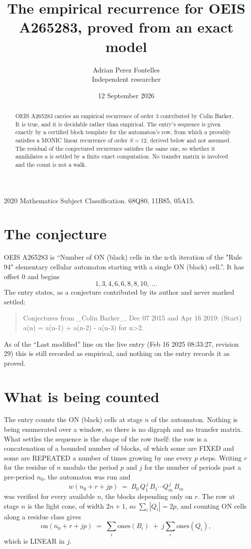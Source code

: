\documentclass[11pt,a4paper]{article}
\title{The empirical recurrence for OEIS A265283, proved from an exact model}
\author{Adrian Perez Fontelles\\ \small Independent researcher}
\date{12 September 2026}
\theoremstyle{plain}
\theoremstyle{definition}
\begin{document}
\maketitle

\begin{abstract}
OEIS A265283 carries an empirical recurrence of order $3$ contributed by Colin Barker. It is true, and it is
decidable rather than empirical. The entry's sequence is given exactly by a certified block template for the automaton's row, from
which $a$ provably satisfies a MONIC linear recurrence of order $S=12$, derived below and not
assumed. The residual of the conjectured recurrence satisfies the same one, so whether it
annihilates $a$ is settled by a finite exact computation. No transfer matrix is involved and
the count is not a walk.
\end{abstract}

\noindent\small 2020 Mathematics Subject Classification. 68Q80, 11B85, 05A15.\normalsize

\section{The conjecture}

OEIS A265283 is ``Number of ON (black) cells in the n-th iteration of the "Rule 94" elementary cellular automaton starting with a single ON (black) cell.''. It has offset $0$ and begins
\[
1, 3, 4, 6, 6, 8, 8, 10,\ \dots
\]
The entry states, as a conjecture contributed by its author and never marked settled:
\begin{quote}
Conjectures from \_Colin Barker\_, Dec 07 2015 and Apr 16 2019: (Start) a(n) = a(n-1) + a(n-2) - a(n-3) for n>2.
\end{quote}
As of the ``Last modified'' line on the live entry (Feb 16 2025 08:33:27, revision 29)
this is still recorded as empirical, and nothing on the entry records it as proved.

\section{What is being counted}

The entry counts the ON (black) cells at stage $n$ of the automaton. Nothing is being enumerated over a window, so there is
no digraph and no transfer matrix. What settles the sequence is the shape of the row itself:
the row is a concatenation of a bounded number of blocks, of which some are
FIXED and some are REPEATED a number of times growing by one every $p$ steps. Writing $r$ for
the residue of $n$ modulo the period $p$ and $j$ for the number of periods past a pre-period
$n_0$, the automaton was run and
\[
w(n_0 + r + jp)\;=\;B_0\,Q_1^{\,j}\,B_1\cdots Q_m^{\,j}\,B_m
\]
was verified for every available $n$, the blocks depending only on $r$. The
row at stage $n$ is the light cone, of width $2n+1$, so $\sum_i|Q_i|=2p$, and counting ON
cells along a residue class gives
\[
\mathrm{on}(n_0+r+jp)\;=\;\sum_i \mathrm{ones}(B_i)\;+\;j\sum_i \mathrm{ones}(Q_i),
\]
which is LINEAR in $j$.
\end{document}
